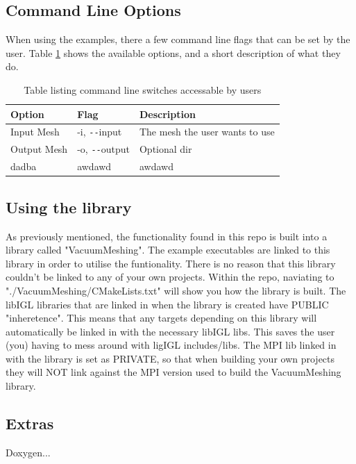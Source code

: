 \documentclass[12pt, letterpaper]{article}
\begin{document}
\subsection{Command Line Options} \label{CLFlags}
When using the examples, there a few command line flags that can be set by the user. Table \ref{CLFlagsTab} shows the available options, and a short description of what they do.

\begin{table}[ht]
\begin{center}
\begin{tabularx}{0.9\textwidth}{
  | >{\raggedright\arraybackslash}X 
  | >{\raggedright\arraybackslash}X 
  | >{\raggedright\arraybackslash}X | }
  \hline
  \textbf{Option} & \textbf{Flag} & \textbf{Description} \\
  \hline
  \hline
  Input Mesh & -i, \texttt{-{}-}input & The mesh the user wants to use\\
  \hline
  Output Mesh & -o, \texttt{-{}-}output & Optional dir\\
  \hline 
  dadba & awdawd & awdawd \\
  \hline
\end{tabularx}
\caption{Table listing command line switches accessable by users}
\label{CLFlagsTab}
\end{center}
\end{table}


\subsection{Using the library}
As previously mentioned, the functionality found in this repo is built into a library called "VacuumMeshing". The example executables are linked to this library in order to utilise the funtionality. There is no reason that this library couldn't be linked to any of your own projects. Within the repo, naviating to "./VacuumMeshing/CMakeLists.txt" will show you how the library is built. The libIGL libraries that are linked in when the library is created have PUBLIC "inheretence". This means that any targets depending on this library will automatically be linked in with the necessary libIGL libs. This saves the user (you) having to mess around with ligIGL includes/libs. The MPI lib linked in with the library is set as PRIVATE, so that when building your own projects they will NOT link against the MPI version used to build the VacuumMeshing library.

\subsection{Extras}
Doxygen...
\end{document}
